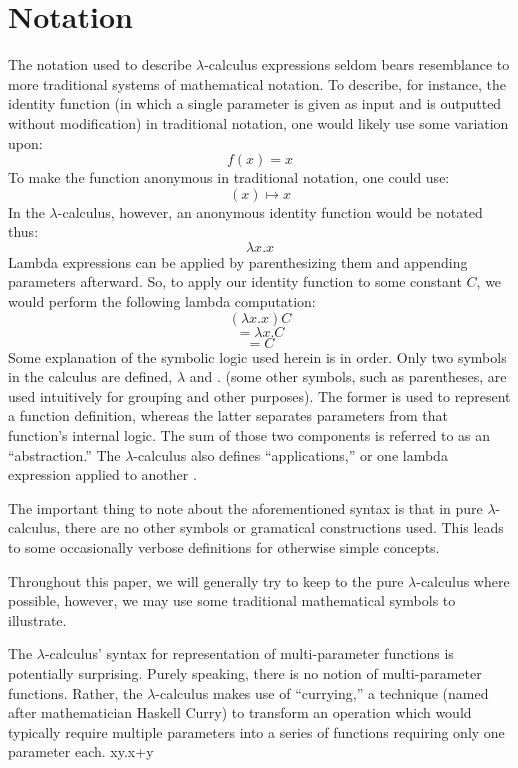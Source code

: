 \documentclass{article}
\begin{document}
\section{Notation}
The notation used to describe $\lambda$-calculus expressions seldom bears resemblance to more traditional systems of mathematical notation. To describe, for instance, the identity function (in which a single parameter is given as input and is outputted without modification) in traditional notation, one would likely use some variation upon:
$$f(x)=x$$
To make the function anonymous in traditional notation, one could use:
$$(x) \mapsto x$$
In the $\lambda$-calculus, however, an anonymous identity function would be notated thus:
$$\lambda x.x$$
Lambda expressions can be applied by parenthesizing them and appending parameters afterward. So, to apply our identity function to some constant $C$, we would perform the following lambda computation:
$$(\lambda x.x)C$$
$$=\lambda x.C$$
$$=C$$
Some explanation of the symbolic logic used herein is in order. Only two symbols in the calculus are defined, $\lambda$ and $.$ (some other symbols, such as parentheses, are used intuitively for grouping and other purposes). The former is used to represent a function definition, whereas the latter separates parameters from that function's internal logic. The sum of those two components is referred to as an ``abstraction.'' The $\lambda$-calculus also defines ``applications,'' or one lambda expression applied to another \cite{horowitz}.

The important thing to note about the aforementioned syntax is that in pure $\lambda$-calculus, there are no other symbols or gramatical constructions used. This leads to some occasionally verbose definitions for otherwise simple concepts.

Throughout this paper, we will generally try to keep to the pure $\lambda$-calculus where possible, however, we may use some traditional mathematical symbols to illustrate.

The $\lambda$-calculus' syntax for representation of multi-parameter functions is potentially surprising. Purely speaking, there is no notion of multi-parameter functions. Rather, the $\lambda$-calculus makes use of ``currying,'' a technique (named after mathematician Haskell Curry) to transform an operation which would typically require multiple parameters into a series of functions requiring only one parameter each.
$$\lambda xy.x+y


\end{document}
